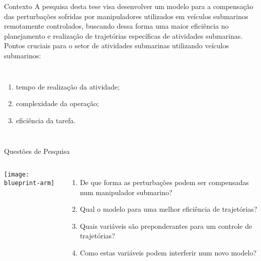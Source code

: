 \begin{frame}[t]{Contexto} 
    \transdissolve[duration=0.5]
    A pesquisa desta tese visa desenvolver um modelo para a compensação das perturbações sofridas por manipuladores utilizados em veículos submarinos remotamente controlados, buscando dessa forma uma maior eficiência no planejamento e realização de trajetórias específicas de atividades submarinas.\\
    \vspace*{0.2cm}
    Pontos cruciais para o setor de atividades submarinas utilizando veículos submarinos:
    \newline
        \begin{columns}[c]
                \begin{enumerate}
                    \item tempo de realização da atividade;
                    \item complexidade da operação;
                    \item eficiência da tarefa.
                \end{enumerate}
        \end{columns}
\end{frame}
\begin{frame}[c]{Questões de Pesquisa}
    \transboxout[duration=0.5]
    \begin{columns}
            \texttt{[image: blueprint-arm]}
            \begin{enumerate}
                \item De que forma as perturbações podem ser compensadas num manipulador submarino?
                \item Qual o modelo para uma melhor eficiência de trajetórias?
                \item Quais variáveis são preponderantes para um controle de trajetórias?
                \item Como estas variáveis podem interferir num novo modelo?
            \end{enumerate}
    \end{columns}
\end{frame}

